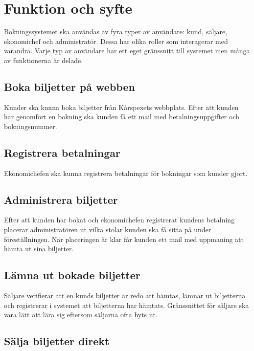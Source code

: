 \documentclass[a4paper, twoside, 11pt, titlepage]{article}
\begin{document}
\clearpage
\section{Funktion och syfte}


Bokningssystemet ska användas av fyra typer av användare: kund, säljare, ekonomichef och administratör. Dessa har olika roller som interagerar med varandra. Varje typ av användare har ett eget gränssnitt till systemet men många av funktionerna är delade.

	\subsection{Boka biljetter på webben}


	Kunder ska kunna boka biljetter från Kårspexets webbplats. Efter att kunden har genomfört en bokning ska kunden få ett mail med betalningsuppgifter och bokningsnummer.

	\subsection{Registrera betalningar}


	Ekonomichefen ska kunna registrera betalningar för bokningar som kunder gjort.

	\subsection{Administrera biljetter}


	Efter att kunden har bokat och ekonomichefen registrerat kundens betalning placerar administratören ut vilka stolar kunden ska få sitta på under föreställningen. När placeringen är klar får kunden ett mail med uppmaning att hämta ut sina biljetter.

	\subsection{Lämna ut bokade biljetter}


	Säljare verifierar att en kunds biljetter är redo att hämtas, lämnar ut biljetterna och registrerar i systemet att biljetterna har hämtats. Gränssnittet för säljare ska vara lätt att lära sig eftersom säljarna ofta byts ut.

	\subsection{Sälja biljetter direkt}
\end{document}
